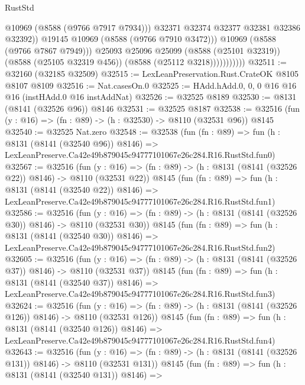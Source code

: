 \begin{lexlean}{RustStd}
\begin{coremodule}
                                @10969
                                (@8588 (@9766 @7917 @7934)))
                              @32371
                              @32374
                              @32377
                              @32381
                              @32386
                              @32392))
                          @19145
                          @10969
                          (@8588 (@9766 @7910 @3472)))
                        @10969
                        (@8588 (@9766 @7867 @7949)))
                      @25093
                      @25096
                      @25099
                      (@8588 (@25101 @32319))
                      (@8588 (@25105 @32319 @456))
                      (@8588 (@25112 @3218)))))))))))
@32511 := @32160 (@32185 @32509)
@32515 := LexLeanPreservation.Rust.CrateOK @8105 @8107 @8109
@32516 := Nat.casesOn.{0}
@32525 := HAdd.hAdd.{0, 0, 0} @16 @16 @16 (instHAdd.{0} @16 instAddNat)
@32526 := @32525 @8189
@32530 := @8131 (@8141 (@32526 @96)) @8146
@32531 := @32525 @8187
@32538 := @32516 (fun (y : @16) => (fn : @89) -> (h : @32530) -> @8110 (@32531 @96)) @8145
@32540 := @32525 Nat.zero
@32548 := @32538
    (fun (fn : @89) =>
    fun (h : @8131 (@8141 (@32540 @96)) @8146) =>
    LexLeanPreserve.Ca42e49b879045c94777101067e26c284.R16.RustStd.fun0)
@32567 := @32516
    (fun (y : @16) => (fn : @89) -> (h : @8131 (@8141 (@32526 @22)) @8146) -> @8110 (@32531 @22))
    @8145
    (fun (fn : @89) =>
    fun (h : @8131 (@8141 (@32540 @22)) @8146) =>
    LexLeanPreserve.Ca42e49b879045c94777101067e26c284.R16.RustStd.fun1)
@32586 := @32516
    (fun (y : @16) => (fn : @89) -> (h : @8131 (@8141 (@32526 @30)) @8146) -> @8110 (@32531 @30))
    @8145
    (fun (fn : @89) =>
    fun (h : @8131 (@8141 (@32540 @30)) @8146) =>
    LexLeanPreserve.Ca42e49b879045c94777101067e26c284.R16.RustStd.fun2)
@32605 := @32516
    (fun (y : @16) => (fn : @89) -> (h : @8131 (@8141 (@32526 @37)) @8146) -> @8110 (@32531 @37))
    @8145
    (fun (fn : @89) =>
    fun (h : @8131 (@8141 (@32540 @37)) @8146) =>
    LexLeanPreserve.Ca42e49b879045c94777101067e26c284.R16.RustStd.fun3)
@32624 := @32516
    (fun (y : @16) => (fn : @89) -> (h : @8131 (@8141 (@32526 @126)) @8146) -> @8110 (@32531 @126))
    @8145
    (fun (fn : @89) =>
    fun (h : @8131 (@8141 (@32540 @126)) @8146) =>
    LexLeanPreserve.Ca42e49b879045c94777101067e26c284.R16.RustStd.fun4)
@32643 := @32516
    (fun (y : @16) => (fn : @89) -> (h : @8131 (@8141 (@32526 @131)) @8146) -> @8110 (@32531 @131))
    @8145
    (fun (fn : @89) =>
    fun (h : @8131 (@8141 (@32540 @131)) @8146) =>

\end{coremodule}
\end{lexlean}
